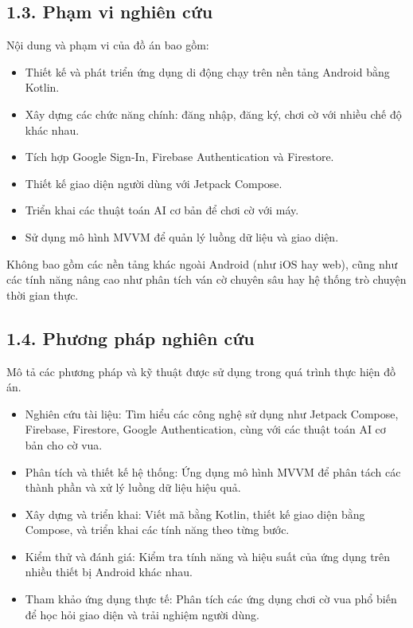\documentclass[a4paper,12pt]{article}
\begin{document}
\subsection*{1.3. Phạm vi nghiên cứu}

\justify
\noindent Nội dung và phạm vi của đồ án bao gồm:
\begin{itemize}[label=·]
    \item Thiết kế và phát triển ứng dụng di động chạy trên nền tảng Android bằng Kotlin.
    \item Xây dựng các chức năng chính: đăng nhập, đăng ký, chơi cờ với nhiều chế độ khác nhau.
    \item Tích hợp Google Sign-In, Firebase Authentication và Firestore.
    \item Thiết kế giao diện người dùng với Jetpack Compose.
    \item Triển khai các thuật toán AI cơ bản để chơi cờ với máy.
    \item Sử dụng mô hình MVVM để quản lý luồng dữ liệu và giao diện.
\end{itemize}
\noindent Không bao gồm các nền tảng khác ngoài Android (như iOS hay web), cũng như các tính năng nâng cao như phân tích ván cờ chuyên sâu hay hệ thống trò chuyện thời gian thực.

\subsection*{1.4. Phương pháp nghiên cứu}

\justify
\noindent Mô tả các phương pháp và kỹ thuật được sử dụng trong quá trình thực hiện đồ án.
\begin{itemize}[label=·]
    \item Nghiên cứu tài liệu: Tìm hiểu các công nghệ sử dụng như Jetpack Compose, Firebase, Firestore, Google Authentication, cùng với các thuật toán AI cơ bản cho cờ vua.
    \item Phân tích và thiết kế hệ thống: Ứng dụng mô hình MVVM để phân tách các thành phần và xử lý luồng dữ liệu hiệu quả.
    \item Xây dựng và triển khai: Viết mã bằng Kotlin, thiết kế giao diện bằng Compose, và triển khai các tính năng theo từng bước.
    \item Kiểm thử và đánh giá: Kiểm tra tính năng và hiệu suất của ứng dụng trên nhiều thiết bị Android khác nhau.
    \item Tham khảo ứng dụng thực tế: Phân tích các ứng dụng chơi cờ vua phổ biến để học hỏi giao diện và trải nghiệm người dùng.
\end{itemize}
\end{document}
